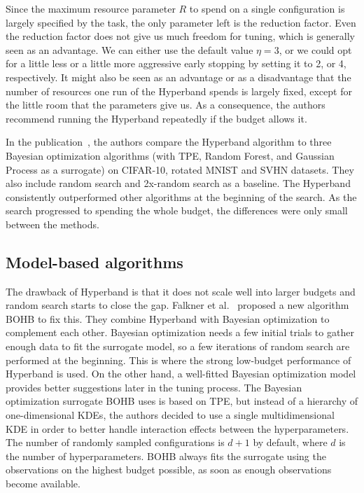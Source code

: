 Since the maximum resource parameter $R$ to spend on a single configuration is largely specified by the task, the only parameter left is the reduction factor. Even the reduction factor does not give us much freedom for tuning, which is generally seen as an advantage. We can either use the default value $\eta=3$, or we could opt for a little less or a little more aggressive early stopping by setting it to 2, or 4, respectively. It might also be seen as an advantage or as a disadvantage that the number of resources one run of the Hyperband spends is largely fixed, except for the little room that the parameters give us. As a consequence, the authors recommend running the Hyperband repeatedly if the budget allows it.

In the publication~\cite{li2018hyperband}, the authors compare the Hyperband algorithm to three Bayesian optimization algorithms (with TPE, Random Forest, and Gaussian Process as a surrogate) on CIFAR-10, rotated MNIST and SVHN datasets. They also include random search and 2x-random search as a baseline. The Hyperband consistently outperformed other algorithms at the beginning of the search. As the search progressed to spending the whole budget, the differences were only small between the methods.

\subsection{Model-based algorithms}
The drawback of Hyperband is that it does not scale well into larger budgets and random search starts to close the gap. Falkner et al.~\cite{falkner2018bohb} proposed a new algorithm BOHB to fix this. They combine Hyperband with Bayesian optimization to complement each other. Bayesian optimization needs a few initial trials to gather enough data to fit the surrogate model, so a few iterations of random search are performed at the beginning. This is where the strong low-budget performance of Hyperband is used. On the other hand, a well-fitted Bayesian optimization model provides better suggestions later in the tuning process. The Bayesian optimization surrogate BOHB uses is based on TPE, but instead of a hierarchy of one-dimensional KDEs, the authors decided to use a single multidimensional KDE in order to better handle interaction effects between the hyperparameters. The number of randomly sampled configurations is $d+1$ by default, where $d$ is the number of hyperparameters. BOHB always fits the surrogate using the observations on the highest budget possible, as soon as enough observations become available.


